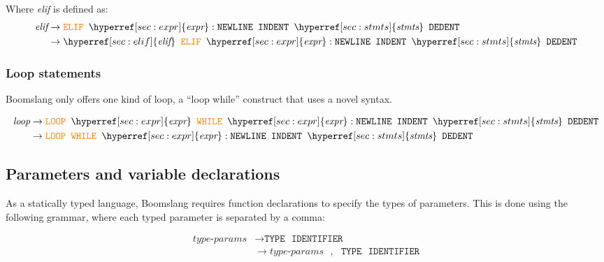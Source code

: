 \documentclass{article}
\begin{document}
\label{sec:elif}
Where \textit{elif} is defined as:
\begin{align*}
    \textit{elif} &\to \textcolor{orange}{\texttt{ELIF}} \texttt{ } \hyperref[sec:expr]{\textit{expr}}: \texttt{NEWLINE} \texttt{ } \texttt{INDENT} \texttt{ } \hyperref[sec:stmts]{\textit{stmts}} \texttt{ } \texttt{DEDENT} \\
    &\to \hyperref[sec:elif]{\textit{elif}} \texttt{ } \textcolor{orange}{\texttt{ELIF}} \texttt{ } \hyperref[sec:expr]{\textit{expr}}: \texttt{NEWLINE} \texttt{ } \texttt{INDENT} \texttt{ } \hyperref[sec:stmts]{\textit{stmts}} \texttt{ } \texttt{DEDENT} \\
\end{align*}

\subsubsection{Loop statements}
Boomslang only offers one kind of loop, a ``loop while'' construct that uses a novel syntax.

\label{sec:loop}
\begin{align*}
    \textit{loop} &\to \textcolor{orange}{\texttt{LOOP}} \texttt{ } \hyperref[sec:expr]{\textit{expr}} \texttt{ } \textcolor{orange}{\texttt{WHILE}} \texttt{ } \hyperref[sec:expr]{\textit{expr}}: \texttt{NEWLINE} \texttt{ } \texttt{INDENT} \texttt{ } \hyperref[sec:stmts]{\textit{stmts}} \texttt{ } \texttt{DEDENT} \\
    &\to \textcolor{orange}{\texttt{LOOP}} \texttt{ } \textcolor{orange}{\texttt{WHILE}} \texttt{ } \hyperref[sec:expr]{\textit{expr}}: \texttt{NEWLINE} \texttt{ } \texttt{INDENT} \texttt{ } \hyperref[sec:stmts]{\textit{stmts}} \texttt{ } \texttt{DEDENT} \\
\end{align*}

\subsection{Parameters and variable declarations}
As a statically typed language, Boomslang requires function declarations to specify the types of parameters. This is done using the following grammar, where each typed parameter is separated by a comma:

\label{sec:type-params}
\begin{align*}
    \textit{type-params} &\to \texttt{TYPE} \texttt{ } \texttt{IDENTIFIER} \\
    &\to \hyperref[sec:type-params]{\textit{type-params}} \texttt{ }, \texttt{ } \texttt{TYPE} \texttt{ } \texttt{IDENTIFIER} \\
\end{align*}
\end{document}
